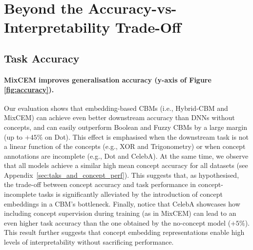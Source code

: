 \documentclass[withindex,glossary]{cam-thesis}
\theoremstyle{plain}
\theoremstyle{definition}
\theoremstyle{remark}
\begin{document}
\section{Beyond the Accuracy-vs-Interpretability Trade-Off}
\subsection{Task Accuracy}

\paragraph{MixCEM improves generalisation accuracy (y-axis of Figure \ref{fig:accuracy}).}
Our evaluation shows that embedding-based CBMs (i.e., Hybrid-CBM and MixCEM) can achieve even better downstream accuracy than DNNs without concepts, and can easily outperform Boolean and Fuzzy CBMs by a large margin (up to $+45\%$ on Dot). This effect is emphasised when the downstream task is not a linear function of the concepts (e.g., XOR and Trigonometry) or when concept annotations are incomplete (e.g., Dot and CelebA). At the same time, we observe that all models achieve a similar high mean concept accuracy for all datasets (see Appendix~\ref{sec:taks_and_concept_perf}). This suggests that, as hypothesised, the trade-off between concept accuracy and task performance in concept-incomplete tasks is significantly alleviated by the introduction of concept embeddings in a CBM's bottleneck. Finally, notice that CelebA showcases how including concept supervision during training (as in MixCEM) can lead to an even higher task accuracy than the one obtained by the no-concept model ($+5\%$). This result further suggests that concept embedding representations enable high levels of interpretability without sacrificing performance.
\end{document}
